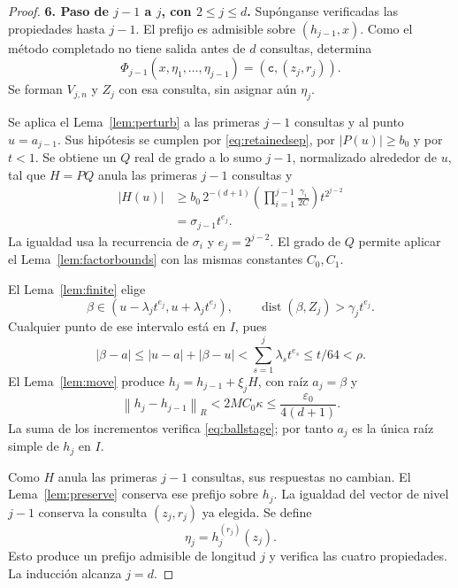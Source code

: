 \documentclass[11pt,a4paper]{article}
\numberwithin{equation}{section}
\theoremstyle{definition}
\theoremstyle{remark}
\newcommand{\norm}[1]{\left\lVert#1\right\rVert}
\newcommand{\ct}{\mathtt c}
\DeclareMathOperator{\dist}{dist}
\newcommand{\paso}[1]{\par\smallskip\noindent\textbf{#1}\quad}
\begin{document}
\begin{proof}
\paso{6. Paso de $j-1$ a $j$, con $2\le j\le d$.}
Supónganse verificadas las propiedades hasta $j-1$. El prefijo es admisible sobre $(h_{j-1},x)$. Como el método completado no tiene salida antes de $d$ consultas, determina
\[
\Phi_{j-1}(x,\eta_1,\ldots,\eta_{j-1})=(\ct,(z_j,r_j)).
\]
Se forman $V_{j,n}$ y $Z_j$ con esa consulta, sin asignar aún $\eta_j$.

Se aplica el Lema~\ref{lem:perturb} a las primeras $j-1$ consultas y al punto $u=a_{j-1}$. Sus hipótesis se cumplen por \eqref{eq:retainedsep}, por $|P(u)|\ge b_0$ y por $t<1$. Se obtiene un $Q$ real de grado a lo sumo $j-1$, normalizado alrededor de $u$, tal que $H=PQ$ anula las primeras $j-1$ consultas y
\begin{align*}
|H(u)|&\ge b_0\,2^{-(d+1)}
\left(\prod_{i=1}^{j-1}\frac{\gamma_i}{2C}\right)t^{2^{j-2}}\\
&=\sigma_{j-1}t^{e_j}.
\end{align*}
La igualdad usa la recurrencia de $\sigma_i$ y $e_j=2^{j-2}$. El grado de $Q$ permite aplicar el Lema~\ref{lem:factorbounds} con las mismas constantes $C_0,C_1$.

El Lema~\ref{lem:finite} elige
\[
\beta\in(u-\lambda_jt^{e_j},u+\lambda_jt^{e_j}),\qquad
\dist(\beta,Z_j)>\gamma_jt^{e_j}.
\]
Cualquier punto de ese intervalo está en $I$, pues
\[
|\beta-a|\le|u-a|+|\beta-u|
<\sum_{s=1}^j\lambda_st^{e_s}\le t/64<\rho.
\]
El Lema~\ref{lem:move} produce $h_j=h_{j-1}+\xi_jH$, con raíz $a_j=\beta$ y
\[
\norm{h_j-h_{j-1}}_R<2MC_0\kappa\le\frac{\varepsilon_0}{4(d+1)}.
\]
La suma de los incrementos verifica \eqref{eq:ballstage}; por tanto $a_j$ es la única raíz simple de $h_j$ en $I$.

Como $H$ anula las primeras $j-1$ consultas, sus respuestas no cambian. El Lema~\ref{lem:preserve} conserva ese prefijo sobre $h_j$. La igualdad del vector de nivel $j-1$ conserva la consulta $(z_j,r_j)$ ya elegida. Se define
\[
\eta_j=h_j^{(r_j)}(z_j).
\]
Esto produce un prefijo admisible de longitud $j$ y verifica las cuatro propiedades. La inducción alcanza $j=d$.


\end{proof}
\end{document}
